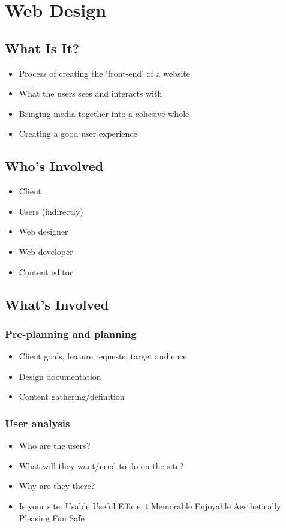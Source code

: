 \section{Web Design}
\subsection{What Is It?}
\begin{itemize}
	\item Process of creating the `front-end' of a website
	\item What the users sees and interacts with
	\item Bringing media together into a cohesive whole
	\item Creating a good user experience
\end{itemize}

\subsection{Who's Involved}
\begin{itemize}
	\item Client
	\item Users (indirectly)
	\item Web designer
	\item Web developer
	\item Content editor
\end{itemize}

\subsection{What's Involved}
\subsubsection{Pre-planning and planning}
\begin{itemize}
	\item Client goals, feature requests, target audience
	\item Design documentation
	\item Content gathering/definition
\end{itemize}
\subsubsection{User analysis}
\begin{itemize}
	\item Who are the users?
	\item What will they want/need to do on the site?
	\item Why are they there?
	\item Is your site:
	\subitem Usable
	\subitem Useful
	\subitem Efficient
	\subitem Memorable
	\subitem Enjoyable
	\subitem Aesthetically Pleasing
	\subitem Fun
	\subitem Safe
\end{itemize}
